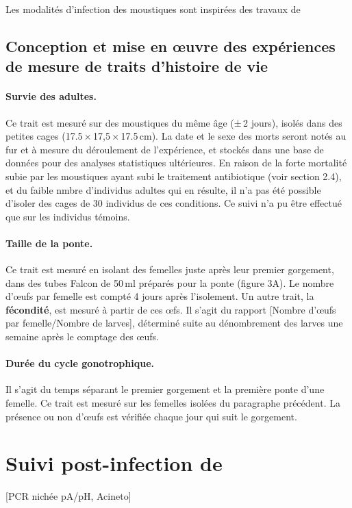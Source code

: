 Les modalités d'infection des moustiques sont inspirées des travaux de \textcite{bahia2014}

\subsection{Conception et mise en \oe{}uvre des expériences de mesure de traits d'histoire de vie}


\paragraph{Survie des adultes.} Ce trait est mesuré sur des moustiques du même âge (±\,2 jours), isolés dans des petites cages (17.5\,×\,17,5\,×\,17.5\,cm). La date et le sexe des morts seront notés au fur et à mesure du déroulement de l'expérience, et stockés dans une base de données pour des analyses statistiques ultérieures.
En raison de la forte mortalité subie par les moustiques ayant subi le traitement antibiotique (voir section 2.4), et du faible nmbre d'individus adultes qui en résulte, il n'a pas été possible d'isoler des cages de 30 individus de ces conditions.
Ce suivi n'a pu être effectué que sur les individus témoins.

\paragraph{Taille de la ponte.} Ce trait est mesuré en isolant des femelles juste après leur premier gorgement, dans des tubes Falcon de 50\,ml préparés pour la ponte (figure 3A). Le nombre d'\oe{}ufs par femelle est compté 4 jours après l'isolement.
Un autre trait, la \textbf{fécondité}, est mesuré à partir de ces \oe{}fs. Il s'agit du rapport [Nombre d'\oe{}ufs par femelle/Nombre de larves], déterminé suite au dénombrement des larves une semaine après le comptage des \oe{}ufs.

\paragraph{Durée du cycle gonotrophique.} Il s'agit du temps séparant le premier gorgement et la première ponte d'une femelle. Ce trait est mesuré sur les femelles isolées du paragraphe précédent. La présence ou non d'\oe{}ufs est vérifiée chaque jour qui suit le gorgement.

\section{Suivi post-infection de }

[PCR nichée pA/pH, Acineto]